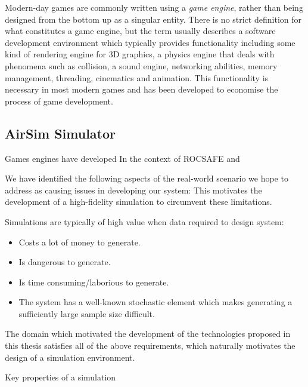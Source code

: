 Modern-day games are commonly written using a \textit{game engine}, rather than being designed from the bottom up as a singular entity. There is no strict definition for what constitutes a game engine, but the term usually describes a software development environment which typically provides functionality including some kind of rendering engine for 3D graphics, a physics engine that deals with phenomena such as collision, a sound engine, networking abilities, memory management, threading, cinematics and animation. This functionality is necessary in most modern games and has been developed to economise the process of game development.\par



\subsection{AirSim Simulator}



Games engines have developed
In the context of ROCSAFE and 



We have identified the following aspects of the real-world scenario we hope to address as causing issues in developing our system:
This motivates the development of a high-fidelity simulation to circumvent these limitations.



Simulations are typically of high value when data required to design system:
\begin{itemize}
    \item Costs a lot of money to generate.
    \item Is dangerous to generate.
    \item Is time consuming/laborious to generate.
    \item The system has a well-known stochastic element which makes generating a sufficiently large sample size difficult.
\end{itemize}
The domain which motivated the development of the technologies proposed in this thesis satisfies all of the above requirements, which naturally motivates the design of a simulation environment. \par

 Key properties of a simulation 


